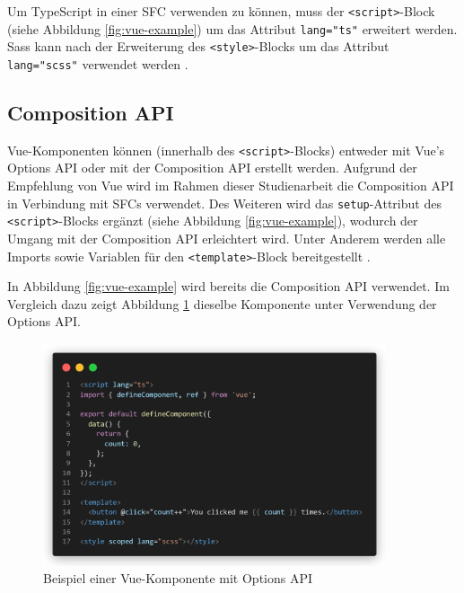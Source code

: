 Um TypeScript in einer \ac{SFC} verwenden zu können, muss der \lstinline{<script>}-Block (siehe Abbildung \ref{fig:vue-example}) um das Attribut \lstinline{lang="ts"} erweitert werden. Sass kann nach der Erweiterung des \lstinline{<style>}-Blocks um das Attribut \lstinline{lang="scss"} verwendet werden \cite[vgl.][]{VueSFC}.

%
%
\subsection{Composition API}
Vue-Komponenten können (innerhalb des \lstinline{<script>}-Blocks) entweder mit Vue's Options API oder mit der Composition API erstellt werden. Aufgrund der Empfehlung von Vue wird im Rahmen dieser Studienarbeit die Composition API in Verbindung mit \acp{SFC} verwendet. Des Weiteren wird das \lstinline{setup}-Attribut des \lstinline{<script>}-Blocks ergänzt (siehe Abbildung \ref{fig:vue-example}), wodurch der Umgang mit der Composition API erleichtert wird. Unter Anderem werden alle Imports sowie Variablen für den \lstinline{<template>}-Block bereitgestellt \cite[vgl.][]{VueIntroduction}.

In Abbildung \ref{fig:vue-example} wird bereits die Composition API verwendet. Im Vergleich dazu zeigt Abbildung \ref{fig:vue-example-options-api} dieselbe Komponente unter Verwendung der Options API.

\begin{figure}[!htb]
  \includegraphics[width=0.9\textwidth]{images/vue-example-options-api.png}
  \centering
  \caption[Beispiel einer Vue-Komponente mit Options API]{Beispiel einer Vue-Komponente mit Options API \cites[vgl.][]{VueIntroduction}[vgl.][]{VueSFC}}
  \label{fig:vue-example-options-api}
\end{figure}

